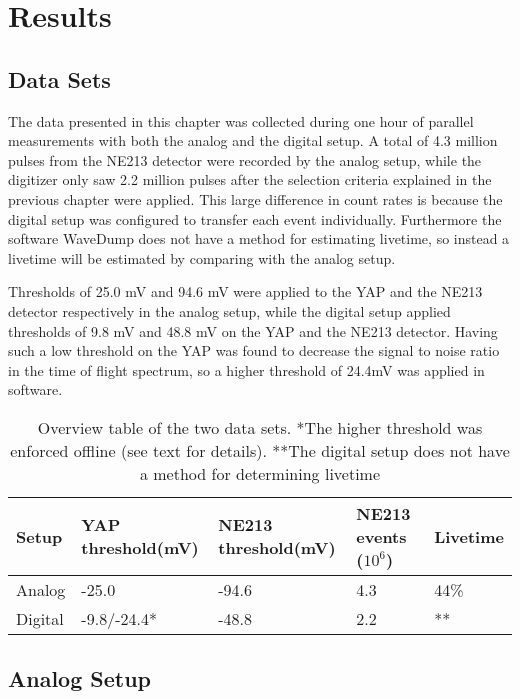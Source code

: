 \documentclass[main.tex]{subfiles}
\begin{document}
\chapter{Results}\label{ch:results}

\section{Data Sets}
The data presented in this chapter was collected during one hour of parallel measurements with both the analog and the digital setup. A total of 4.3 million pulses from the NE213 detector were recorded by the analog setup, while the digitizer only saw 2.2 million pulses after the selection criteria explained in the previous chapter were applied. This large difference in count rates is because the digital setup was configured to transfer each event individually. Furthermore the software WaveDump does not have a method for estimating livetime, so instead a livetime will be estimated by comparing with the analog setup.

Thresholds of 25.0 mV and 94.6 mV were applied to the YAP and the NE213 detector respectively in the analog setup, while the digital setup applied thresholds of 9.8 mV and 48.8 mV on the YAP and the NE213 detector. Having such a low threshold on the YAP was found to decrease the signal to noise ratio in the time of flight spectrum, so a higher threshold of 24.4\si{\milli\volt} was applied in software.
\begin{table}[bh]
\begin{tabular}{|l|l|l|l|l|}
\hline
Setup   & YAP threshold(mV) & NE213 threshold(mV) & NE213 events ($\text{10}^\text{6}$) & Livetime \\ \hline
Analog  & -25.0              & -94.6                & 4.3      & 44\%             \\ \hline
Digital & -9.8/-24.4*			& -48.8                & 2.2      & **             \\ \hline
\end{tabular}
\caption[Overview table of the two data sets.]{Overview table of the two data sets. *The higher threshold was enforced offline (see text for details). **The digital setup does not have a method for determining livetime}
\label{tab:settings}
\end{table}

\section{Analog Setup}
\end{document}
